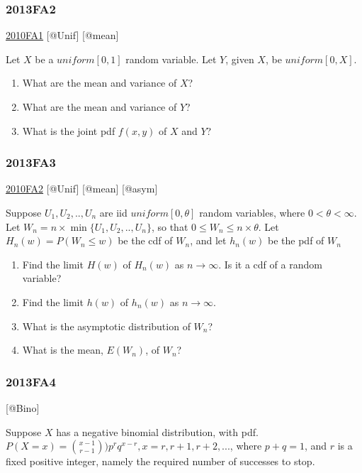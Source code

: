 \documentclass[6pt,Portrait]{article}
\begin{document}
\hypertarget{fa2-2}{%
\subsubsection{2013FA2}\label{fa2-2}}

\protect\hyperlink{fa1-1}{2010FA1} {[}@Unif{]} {[}@mean{]}

Let \(X\) be a \(uniform[0,1]\) random variable. Let \(Y\), given \(X\),
be \(uniform[0,X]\).

\begin{enumerate}
\def\labelenumi{(\alph{enumi})}
\item
  What are the mean and variance of \(X\)?
\item
  What are the mean and variance of \(Y\)?
\item
  What is the joint pdf \(f(x,y)\) of \(X\) and \(Y\)?
\end{enumerate}

\hypertarget{fa3-2}{%
\subsubsection{2013FA3}\label{fa3-2}}

\protect\hyperlink{fa2-1}{2010FA2} {[}@Unif{]} {[}@mean{]} {[}@asym{]}

Suppose \(U_1,U_2,..,U_n\) are iid \(uniform[0,\theta]\) random
variables, where \(0<\theta<\infty\). Let
\(W_n=n\times\min\{U_1,U_2,..,U_n\}\), so that
\(0\le W_n\le n\times\theta\). Let \(H_n(w)=P(W_n\le w)\) be the cdf of
\(W_n\), and let \(h_n(w)\) be the pdf of \(W_n\)

\begin{enumerate}
\def\labelenumi{(\alph{enumi})}
\item
  Find the limit \(H(w)\) of \(H_n(w)\) as \(n\to\infty\). Is it a cdf
  of a random variable?
\item
  Find the limit \(h(w)\) of \(h_n(w)\) as \(n\to\infty\).
\item
  What is the asymptotic distribution of \(W_n\)?
\item
  What is the mean, \(E(W_n)\), of \(W_n\)?
\end{enumerate}

\hypertarget{fa4-2}{%
\subsubsection{2013FA4}\label{fa4-2}}

{[}@Bino{]}

Suppose \(X\) has a negative binomial distribution, with pdf.
\(P(X=x)=\binom{x-1}{r-1})p^rq^{x-r},x=r,r+1,r+2,...\), where
\(p+ q=1\), and \(r\) is a fixed positive integer, namely the required
number of successes to stop.
\end{document}
